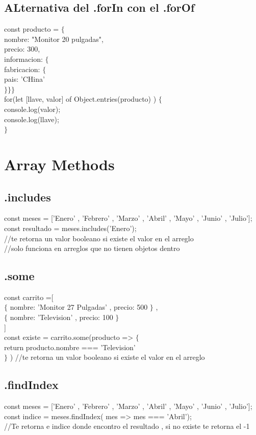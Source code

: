\documentclass[10pt,a4paper]{article}
\begin{document}
\subsection{ALternativa del .forIn con el .forOf} 
const producto = $ \{ $ \\ nombre: "Monitor 20 pulgadas", \\ precio: 300, \\ informacion: $ \{ $ \\
fabricacion:  $ \{ $ \\ pais: 'CHina' \\ $ \} \} \}$  \\
for(let [llave, valor] of Object.entries(producto) ) $ \{ $ \\
console.log(valor);\\
console.log(llave);\\
$ \} $ 


\newpage
\section{Array Methods}
\subsection{.includes} 
const meses = ['Enero' , 'Febrero' , 'Marzo' , 'Abril' , 'Mayo' , 'Junio' , 'Julio']; \\
const resultado = meses.includes('Enero'); \\
//te retorna un valor booleano si existe el valor en el arreglo \\
//solo funciona en arreglos que no tienen objetos dentro \\
\subsection{.some} 
const carrito =[ \\ $ \{ $ nombre: 'Monitor 27 Pulgadas' , precio: 500 $ \} $ , \\ $ \{ $ nombre: 'Television' , precio: 100 $ \} $  \\ ]  \\
const existe = carrito.some(producto => $\{$ \\ 
return producto.nombre === 'Television'  \\
$\}$  )
//te retorna un valor booleano si existe el valor en el arreglo
\subsection{.findIndex} 
const meses = ['Enero' , 'Febrero' , 'Marzo' , 'Abril' , 'Mayo' , 'Junio' , 'Julio']; \\
const indice = meses.findIndex( mes => mes === 'Abril'); \\
//Te retorna e indice donde encontro el resultado , si no existe te retorna el -1 \\
\end{document}
